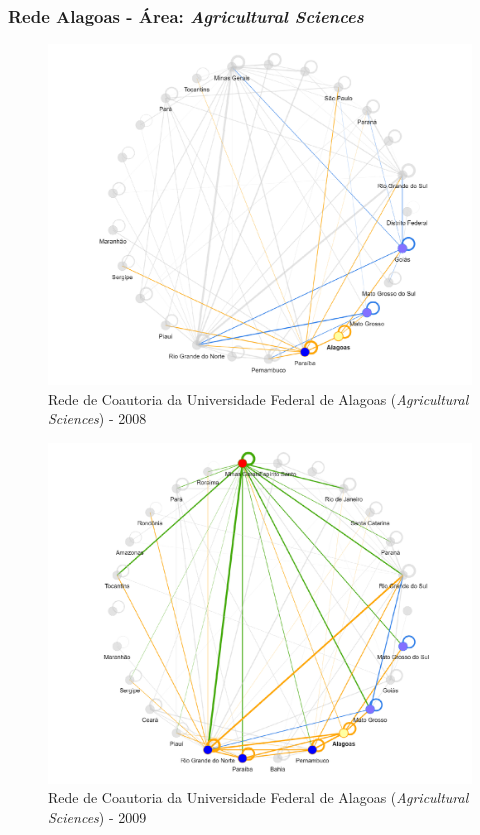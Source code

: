 \subsubsection{Rede Alagoas - Área: \textit{Agricultural Sciences}}

\begin{figure}[H]
	\centering
	\includegraphics[width=\linewidth]{Imagens/rede-agr-AL-2008.pdf}
	\caption{Rede de Coautoria da Universidade Federal de Alagoas (\textit{Agricultural Sciences}) - 2008}
	\label{Rede de Coautoria - UF AGRI AL 2008}
\end{figure}

\begin{figure}[H]
	\centering
	\includegraphics[width=\linewidth]{Imagens/rede-agr-AL-2009.pdf}
	\caption{Rede de Coautoria da Universidade Federal de Alagoas (\textit{Agricultural Sciences}) - 2009}
	\label{Rede de Coautoria - UF AGRI AL 2009}
\end{figure}

